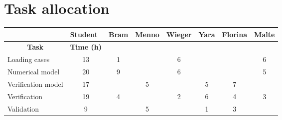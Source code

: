 \section{Task allocation}
\begin{center}
    

\begin{table}[H]
\centering
\begin{tabular}{l|c|c|c|c|c|c|c|}

\cline{2-8}
\textbf{}                                  & \multicolumn{1}{l|}{\textbf{Student}} & \multicolumn{1}{l|}{Bram} & \multicolumn{1}{l|}{Menno} & \multicolumn{1}{l|}{Wieger} & \multicolumn{1}{l|}{Yara} & \multicolumn{1}{l|}{Florina} & \multicolumn{1}{l|}{Malte} \\ \hline
\multicolumn{1}{|c|}{\textbf{Task}}        & \textbf{Time (h)}                     &                           &                            &                             &                           &                              &                            \\ \hline
\multicolumn{1}{|l|}{Loading cases}        & 13                                     &   1                        &                            & 6                        &                           &                              & 6                          \\ \hline
\multicolumn{1}{|l|}{Numerical model}      & 20                                    & 9                         &                            & 6                           &                           &                              & 5                          \\ \hline
\multicolumn{1}{|l|}{Verification model}   & 17                                   &                            & 5                          &                             & 5                         & 7                            &                            \\ \hline
\multicolumn{1}{|l|}{Verification}         & 19                                     &     4                      &                            &  2                           & 6                         & 4                            &      3                      \\ \hline
\multicolumn{1}{|l|}{Validation}           & 9                                     &                           & 5                        &                             & 1                          & 3                            &                            \\ \hline

\end{tabular}
\end{table}
\end{center}
